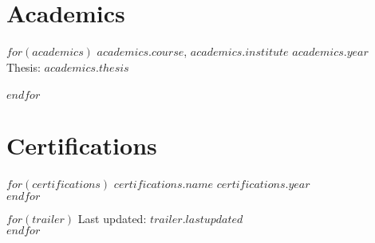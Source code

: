\documentclass[$fontsize$, a4paper]{article}
\begin{document}
\section*{Academics}
$for(academics)$
  $academics.course$, \href{$academics.url$}{$academics.institute$} \hfill\emph{$academics.year$}\\
  {\footnotesize Thesis: \href{$academics.thesis_url$}{$academics.thesis$}}\\
  \\[.05cm]
$endfor$

\section*{Certifications}
$for(certifications)$
  \href{$certifications.url$}{$certifications.name$} \hfill\emph{$certifications.year$}\\
$endfor$

\vspace{1cm}
$for(trailer)$
  Last updated: $trailer.lastupdated$\\
$endfor$
\end{document}
